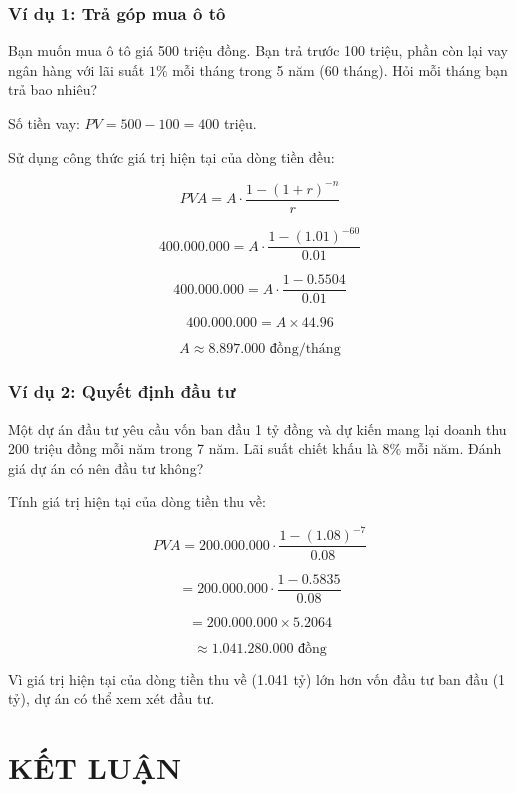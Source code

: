 \documentclass[12pt,a4paper]{report}
\begin{document}
\subsection{Ví dụ 1: Trả góp mua ô tô}

Bạn muốn mua ô tô giá 500 triệu đồng. Bạn trả trước 100 triệu, phần còn lại vay ngân hàng với lãi suất $1\%$ mỗi tháng trong 5 năm (60 tháng). Hỏi mỗi tháng bạn trả bao nhiêu?

Số tiền vay:
$PV = 500 - 100 = 400$ triệu.

Sử dụng công thức giá trị hiện tại của dòng tiền đều:

\[
    PVA = A \cdot \frac{1 - (1 + r)^{-n}}{r}
\]

\[
    400.000.000
    = A \cdot \frac{1 - (1.01)^{-60}}{0.01}
\]

\[
    400.000.000
    = A \cdot \frac{1 - 0.5504}{0.01}
\]

\[
    400.000.000 = A \times 44.96
\]

\[
    A \approx 8.897.000 \text{ đồng/tháng}
\]

\subsection{Ví dụ 2: Quyết định đầu tư}

Một dự án đầu tư yêu cầu vốn ban đầu 1 tỷ đồng và dự kiến mang lại doanh thu 200 triệu đồng mỗi năm trong 7 năm. Lãi suất chiết khấu là $8\%$ mỗi năm. Đánh giá dự án có nên đầu tư không?

Tính giá trị hiện tại của dòng tiền thu về:

\[
    PVA
    = 200.000.000 \cdot
    \frac{1 - (1.08)^{-7}}{0.08}
\]

\[
    = 200.000.000 \cdot
    \frac{1 - 0.5835}{0.08}
\]

\[
    = 200.000.000 \times 5.2064
\]

\[
    \approx 1.041.280.000 \text{ đồng}
\]

Vì giá trị hiện tại của dòng tiền thu về (1.041 tỷ) lớn hơn vốn đầu tư ban đầu (1 tỷ), dự án có thể xem xét đầu tư.


\chapter*{KẾT LUẬN}
\end{document}
